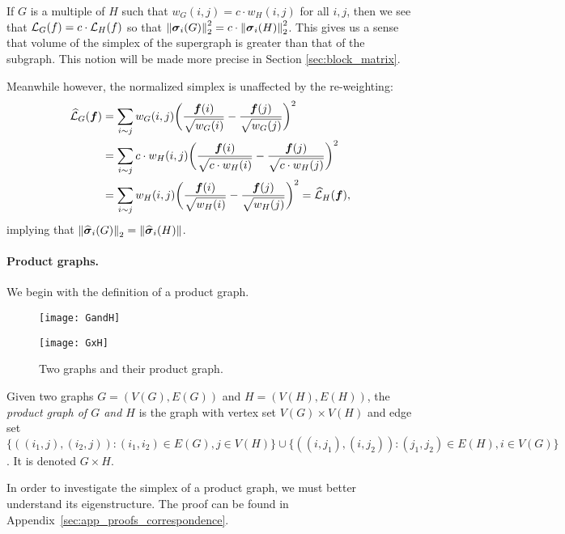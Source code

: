 If $G$ is a multiple of $H$ such that $w_G(i,j)=c\cdot w_H(i,j)$ for all $i,j$, then we see that $\mathcal{L}_G(f)=c\cdot \mathcal{L}_H(f)$ so that $\norm{\vb*{\sigma}_i(G)}_2^2 =c\cdot \norm{\vb*{\sigma}_i(H)}_2^2$. This gives us a sense that volume of the simplex of the supergraph is greater than that of the subgraph. This notion will be made more precise in Section \ref{sec:block_matrix}. 

Meanwhile however, the normalized simplex is unaffected by the re-weighting: 
\begin{align*}\widehat{\mathcal{L}}_G(\vb*{f})&=\sum_{i\sim j}w_G(i,j)\bigg(\frac{\vb*{f}(i)}{\sqrt{w_G(i)}}-\frac{\vb*{f}(j)}{\sqrt{w_G(j)}}\bigg)^2\\
&= \sum_{i\sim j}c\cdot w_H(i,j)\bigg(\frac{\vb*{f}(i)}{\sqrt{c\cdot w_H(i)}}-\frac{\vb*{f}(j)}{\sqrt{c\cdot w_H(j)}}\bigg)^2 \\
&= \sum_{i\sim j} w_H(i,j)\bigg(\frac{\vb*{f}(i)}{\sqrt{ w_H(i)}}-\frac{\vb*{f}(j)}{\sqrt{ w_H(j)}}\bigg)^2 = \widehat{\mathcal{L}}_H(\vb*{f}),
\end{align*}
implying that $\norm{\widehat{\vb*{\sigma}}_i(G)}_2 = \norm{\widehat{\vb*{\sigma}}_i(H)}$. 

\paragraph{Product graphs.}
We begin with the definition of a product graph. 

\begin{figure}
	\centering
	\begin{minipage}{0.45\textwidth}
		\centering
		\texttt{[image: GandH]}
	\end{minipage}
\begin{minipage}{0.45\textwidth}
	\centering
	\texttt{[image: GxH]}
\end{minipage}
\caption{Two graphs and their product graph.}
\end{figure}

\begin{definition}
	\label{def:product_graphs}
	Given two graphs $G=(V(G),E(G))$ and $H=(V(H), E(H))$, the \emph{product graph of $G$ and $H$} is the graph with vertex set $V(G)\times V(H)$ and edge set
	$\{((i_1,j),(i_2,j)):(i_1,i_2)\in E(G), j\in V(H)\}\cup\{((i,j_1),(i,j_2)):(j_1,j_2)\in E(H), i\in V(G)\}$. It is denoted $G\times H$. 
\end{definition} 

In order to investigate the simplex of a product graph, we must better understand its eigenstructure. The proof can be found  in Appendix~\ref{sec:app_proofs_correspondence}. 

